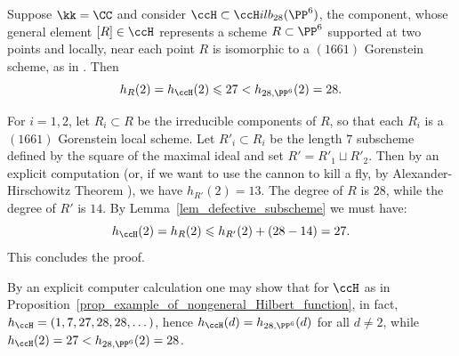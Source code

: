 \documentclass[12pt,a4paper]{article}
\newcommand{\usualHilb}{{\ccH}ilb}
\begin{document}
\begin{prop}
   \label{prop_example_of_nongeneral_Hilbert_function}
   Suppose $\kk=\CC$ and consider $\ccH \subset \usualHilb_{28}(\PP^6)$, the component, whose general element $[R]\in \ccH$ represents a scheme $R\subset \PP^6$ supported at two points and locally, near each point $R$ is isomorphic to a $(1661)$ Gorenstein scheme, as in \cite[Thm~1.1]{jelisiejew_VSP_and_Gorenstein_locus_for_14_points}.
   Then
   \[
      h_{R}(2) = h_{\ccH}(2) \leqslant 27 < h_{28, \PP^6}(2) = 28.
   \]
\end{prop}

\begin{prf}
   For $i=1, 2$, let $R_i\subset R$ be the irreducible components of $R$, so that each $R_i$ is a $(1661)$ Gorenstein local scheme.
   Let $R'_i \subset R_i$ be the length $7$ subscheme defined by the square of the maximal ideal and set $R'=R'_1 \sqcup R'_2$.
   Then by an explicit computation (or, if we want to use the cannon to kill a fly, by Alexander-Hirschowitz Theorem \cite[Thm~1.1]{brambilla_ottaviani_on_AH_theorem}),
   we have $h_{R'}(2) = 13$.
   The degree of $R$ is $28$, while the degree of $R'$ is $14$.
   By Lemma~\ref{lem_defective_subscheme} we must have:
   \[
      h_{\ccH}(2) = h_{R}(2)  \leqslant h_{R'}(2) + (28-14) = 27.
   \]
   This concludes the proof.
\end{prf}

By an explicit computer calculation one may show that for $\ccH$ as in Proposition~\ref{prop_example_of_nongeneral_Hilbert_function}, in fact, $h_{\ccH} = (1,7, 27,28,28,\dotsc)$,
hence $h_{\ccH}(d) = h_{28, \PP^6}(d)$ for all $d\neq 2$,
while $h_{\ccH}(2) =27 < h_{28, \PP^6}(2)= 28$.

%

% 

% 
\end{document}
